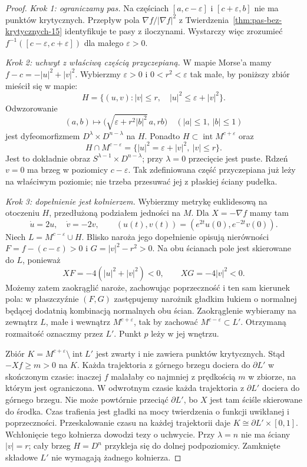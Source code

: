 \begin{proof}
\emph{Krok 1: ograniczamy pas.}
Na częściach $[a,c-\varepsilon]$
i $[c+\varepsilon,b]$ nie ma
punktów krytycznych.
Przepływ pola $\nabla f/|\nabla f|^2$
z Twierdzenia~\ref{thm:pas-bez-krytycznych-15}
identyfikuje te pasy z iloczynami.
Wystarczy więc zrozumieć
$f^{-1}([c-\varepsilon,c+\varepsilon])$
dla małego $\varepsilon>0$.

\emph{Krok 2: uchwyt z właściwą częścią przyczepianą.}
W mapie Morse'a mamy $f-c=-|u|^2+|v|^2$.
Wybierzmy $\varepsilon>0$ i $0<r^2<\varepsilon$
tak małe, by poniższy zbiór mieścił się w mapie:
\[
 H=\{(u,v): |v|\leq r,\quad |u|^2\leq\varepsilon+|v|^2\}.
\]
Odwzorowanie
\[
 (a,b)\longmapsto
 \bigl(\sqrt{\varepsilon+r^2|b|^2}\,a,rb\bigr)
 \quad (|a|\leq1,\ |b|\leq1)
\]
jest dyfeomorfizmem $D^\lambda\times D^{n-\lambda}$ na $H$.
Ponadto $H\subset\operatorname{int}M^{c+\varepsilon}$ oraz
\[
 H\cap M^{c-\varepsilon}
 =\{|u|^2=\varepsilon+|v|^2,\ |v|\leq r\}.
\]
Jest to dokładnie obraz $S^{\lambda-1}\times D^{n-\lambda}$;
przy $\lambda=0$ przecięcie jest puste.
Rdzeń $v=0$ ma brzeg w poziomicy $c-\varepsilon$.
Tak zdefiniowana część przyczepiana już leży na właściwym
poziomie; nie trzeba przesuwać jej z płaskiej ściany pudełka.

\emph{Krok 3: dopełnienie jest kołnierzem.}
Wybierzmy metrykę euklidesową na otoczeniu $H$,
przedłużoną podziałem jedności na $M$.
Dla $X=-\nabla f$ mamy tam
\[
 \dot u=2u,\quad\dot v=-2v,\qquad
 (u(t),v(t))=(e^{2t}u(0),e^{-2t}v(0)).
\]
Niech $L=M^{c-\varepsilon}\cup H$.
Blisko naroża jego dopełnienie opisują nierówności
$F=f-(c-\varepsilon)>0$ i $G=|v|^2-r^2>0$.
Na obu ścianach pole jest skierowane do $L$, ponieważ
\[
 XF=-4(|u|^2+|v|^2)<0,\qquad XG=-4|v|^2<0.
\]
Możemy zatem zaokrąglić naroże, zachowując poprzeczność
i ten sam kierunek pola: w płaszczyźnie $(F,G)$
zastępujemy narożnik gładkim łukiem o normalnej
będącej dodatnią kombinacją normalnych obu ścian.
Zaokrąglenie wybieramy na zewnątrz $L$, małe i wewnątrz
$M^{c+\varepsilon}$, tak by zachować $M^{c-\varepsilon}\subset L'$.
Otrzymaną rozmaitość oznaczmy przez $L'$.
Punkt $p$ leży w jej wnętrzu.

Zbiór $K=M^{c+\varepsilon}\setminus\operatorname{int}L'$
jest zwarty i nie zawiera punktów krytycznych.
Stąd $-Xf\geq m>0$ na $K$.
Każda trajektoria z górnego brzegu dociera do $\partial L'$
w skończonym czasie: inaczej $f$ malałaby co najmniej
z prędkością $m$ w zbiorze, na którym jest ograniczona.
W odwrotnym czasie każda trajektoria z $\partial L'$
dociera do górnego brzegu. Nie może powtórnie przeciąć
$\partial L'$, bo $X$ jest tam ściśle skierowane do środka.
Czas trafienia jest gładki na mocy twierdzenia
o funkcji uwikłanej i poprzeczności.
Przeskalowanie czasu na każdej trajektorii daje
$K\cong\partial L'\times[0,1]$.
Wchłonięcie tego kołnierza dowodzi tezy o uchwycie.
Przy $\lambda=n$ nie ma ściany $|v|=r$;
cały brzeg $H=D^n$ przykleja się do dolnej podpoziomicy.
Zamknięte składowe $L'$ nie wymagają żadnego kołnierza.


\end{proof}
